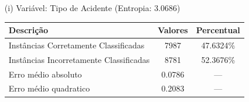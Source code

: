 \begin{enumerate}
	\item[(i)] Variável: Tipo de Acidente (Entropia: 3.0686)
		\begin{table}[!ht]
			\centering
			\vspace{1mm}
			\begin{tabular}{l|c|c}
				\hline
				\textbf{Descrição} & \textbf{Valores} & \textbf{Percentual} \\
				\hline
				Instâncias Corretamente Classificadas & 7987 & 47.6324\% \\
				Instâncias Incorretamente Classificadas & 8781 & 52.3676\% \\
				Erro médio absoluto & 0.0786 & ---  \\
				Erro médio quadratico & 0.2083 & --- \\
			\end{tabular}
		\end{table}
		
		\pagebreak
		

\end{enumerate}
